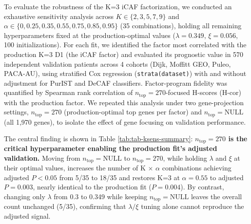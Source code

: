 \documentclass[
]{article}
\begin{document}
To evaluate the robustness of the K=3 iCAF factorization, we conducted
an exhaustive sensitivity analysis across \(K \in \{2, 3, 5, 7, 9\}\)
and \(\alpha \in \{0, 0.25, 0.35, 0.55, 0.75, 0.85, 0.95\}\) (35
combinations), holding all remaining hyperparameters fixed at the
production-optimal values (\(\lambda = 0.349\), \(\xi = 0.056\), 100
initializations). For each fit, we identified the factor most correlated
with the production K=3 D1 (the iCAF factor) and evaluated its
prognostic value in 570 independent validation patients across 4 cohorts
(Dijk, Moffitt GEO, Puleo, PACA-AU), using stratified Cox regression
(\texttt{strata(dataset)}) with and without adjustment for PurIST and
DeCAF classifiers. Factor-program fidelity was quantified by Spearman
rank correlation of \(n_{\text{top}} = 270\)-focused H-scores (H-cor)
with the production factor. We repeated this analysis under two
gene-projection settings, \(n_{\text{top}} = 270\) (production-optimal
top genes per factor) and \(n_{\text{top}} = \text{NULL}\) (all 1,970
genes), to isolate the effect of gene focusing on validation
performance.

The central finding is shown in Table \ref{tab:tab-ksens-summary}:
\textbf{\(n_{\text{top}} = 270\) is the critical hyperparameter enabling
the production fit's adjusted validation.} Moving from
\(n_{\text{top}} = \text{NULL}\) to \(n_{\text{top}} = 270\), while
holding \(\lambda\) and \(\xi\) at their optimal values, increases the
number of K \(\times\) \(\alpha\) combinations achieving adjusted
\(P < 0.05\) from 5/35 to 18/35 and restores K=3 at \(\alpha=0.55\) to
adjusted \(P = 0.003\), nearly identical to the production fit
(\(P = 0.004\)). By contrast, changing only \(\lambda\) from 0.3 to
0.349 while keeping \(n_{\text{top}} = \text{NULL}\) leaves the overall
count unchanged (5/35), confirming that \(\lambda/\xi\) tuning alone
cannot reproduce the adjusted signal.
\end{document}
